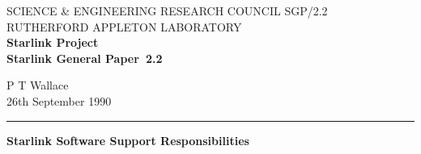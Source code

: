 \pagestyle{myheadings}

\newcommand{\stardoccategory}  {Starlink General Paper}
\newcommand{\stardocinitials}  {SGP}
\newcommand{\stardocnumber}    {2.2}
\newcommand{\stardocauthors}   {P T Wallace}
\newcommand{\stardocdate}      {26th September 1990}
\newcommand{\stardoctitle}     {Starlink Software Support Responsibilities}

\newcommand{\stardocname}{\stardocinitials /\stardocnumber}
\markright{\stardocname}
\setlength{\textwidth}{160mm}
\setlength{\textheight}{240mm}
\setlength{\topmargin}{-5mm}
\setlength{\oddsidemargin}{0mm}
\setlength{\evensidemargin}{0mm}
\setlength{\parindent}{0mm}
\setlength{\parskip}{\medskipamount}
\setlength{\unitlength}{1mm}

\newcommand{\sect}[1]   {\addtocounter{sectno}{1}
                         \goodbreak\vspace{4ex}\noindent
                         {\thesectno}.\hspace*{1em}{\bf #1}\\[3ex]}


\thispagestyle{empty}
SCIENCE \& ENGINEERING RESEARCH COUNCIL \hfill \stardocname\\
RUTHERFORD APPLETON LABORATORY\\
{\large\bf Starlink Project\\}
{\large\bf \stardoccategory\ \stardocnumber}
\begin{flushright}
\stardocauthors\\
\stardocdate
\end{flushright}
\vspace{-4mm}
\rule{\textwidth}{0.5mm}
\vspace{5mm}
\begin{center}
{\Large\bf \stardoctitle}
\end{center}
\vspace{5mm}

